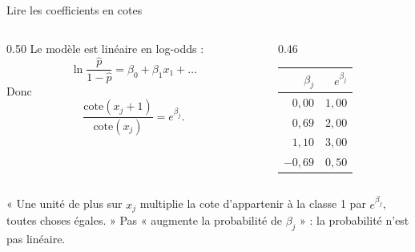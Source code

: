 \begin{frame}{Lire les coefficients en cotes}
\begin{columns}[t]
\begin{column}{0.50\textwidth}
Le modèle est linéaire en log-odds :
\[
  \ln\frac{\hat p}{1-\hat p}=\beta_0+\beta_1x_1+\dots
\]
Donc
\[
  \frac{\text{cote}(x_j+1)}{\text{cote}(x_j)}=e^{\beta_j}.
\]
\end{column}
\begin{column}{0.46\textwidth}
\begin{center}
\small
\begin{tabular}{@{}rr@{}}
\toprule
$\beta_j$ & $e^{\beta_j}$ \\
\midrule
$0{,}00$ & $1{,}00$ \\
$0{,}69$ & $2{,}00$ \\
$1{,}10$ & $3{,}00$ \\
$-0{,}69$ & $0{,}50$ \\
\bottomrule
\end{tabular}
\end{center}
\end{column}
\end{columns}
\vspace{2mm}
\begin{kbox}
« Une unité de plus sur $x_j$ multiplie la cote d'appartenir à la classe 1 par
$e^{\beta_j}$, toutes choses égales. » Pas « augmente la probabilité de
$\beta_j$ » : la probabilité n'est pas linéaire.
\end{kbox}
\end{frame}

